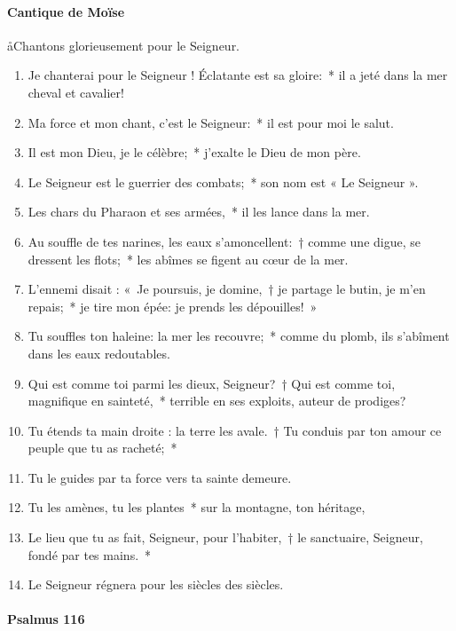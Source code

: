 \documentclass[twoside]{article}
\begin{document}
\begin{paracol}[1]{2}
\switchcolumn

\paragraph{Cantique de Moïse}

\aa Chantons glorieusement pour le Seigneur.



\begin{enumerate}[wide, itemsep=0mm, labelwidth=!, labelindent=0pt, label=\color{gregoriocolor}\theenumi]
\item Je chanterai pour le Seigneur ! Éclatante est sa gloire:~* il a jeté dans la mer cheval et cavalier!
\item Ma force et mon chant, c'est le Seigneur:~* il est pour moi le salut.
\item Il est mon Dieu, je le célèbre;~* j'exalte le Dieu de mon père.
\item Le Seigneur est le guerrier des combats;~* son nom est « Le Seigneur ».
\item Les chars du Pharaon et ses armées,~* il les lance dans la mer.
\item Au souffle de tes narines, les eaux s'amoncellent:~† comme une digue, se dressent les flots;~* les abîmes se figent au cœur de la mer.
\item L'ennemi disait : «~Je poursuis, je domine,~† je partage le butin, je m'en repais;~* je tire mon épée: je prends les dépouilles!~»
\item Tu souffles ton haleine: la mer les recouvre;~* comme du plomb, ils s'abîment dans les eaux redoutables.
\item Qui est comme toi parmi les dieux, Seigneur?~† Qui est comme toi, magnifique en sainteté,~* terrible en ses exploits, auteur de prodiges?
\item Tu étends ta main droite : la terre les avale.~† Tu conduis par ton amour ce peuple que tu as racheté;~*
\item Tu le guides par ta force vers ta sainte demeure.
\item Tu les amènes, tu les plantes~* sur la montagne, ton héritage,
\item Le lieu que tu as fait, Seigneur, pour l'habiter,~† le sanctuaire, Seigneur, fondé par tes mains.~*
\item Le Seigneur régnera pour les siècles des siècles.
\end{enumerate}
\newpage%
\switchcolumn*

\paragraph{Psalmus 116}


\end{paracol}
\end{document}
